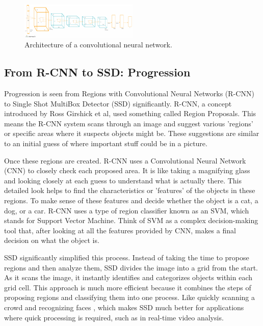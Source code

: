 \documentclass[11pt,journal,compsoc]{IEEEtran}
\begin{document}
\begin{figure}[ht]
  \centering
  \includegraphics[width=0.5\textwidth]{images/cnn_architecture.png} 
  \caption{Architecture of a convolutional neural network.}
  \label{fig:cnn}
\end{figure}

\subsection{From R-CNN to SSD: Progression}
Progression is seen from Regions with Convolutional Neural Networks (R-CNN) to Single Shot MultiBox Detector (SSD) significantly.  R-CNN, a concept introduced by Ross Girshick et al, used something called Region Proposals. This means the R-CNN system scans through an image and suggest various 'regions' or specific areas where it suspects objects might be. These suggestions are similar to an initial guess of where important stuff could be in a picture.

Once these regions are created. R-CNN uses a Convolutional Neural Network (CNN) to closely check each proposed area. It is like taking a magnifying glass and looking closely at each guess to understand what is actually there. This detailed look helps to find the characteristics or 'features' of the objects in these regions. To make sense of these features and decide whether the object is a cat, a dog, or a car. R-CNN uses a type of region classifier known as an SVM, which stands for Support Vector Machine.\cite{Girshick_2014_CVPR} Think of SVM as a complex decision-making tool that, after looking at all the features provided by CNN, makes a final decision on what the object is.

SSD\cite{9262816} significantly simplified this process. Instead of taking the time to propose regions and then analyze them, SSD divides the image into a grid from the start. As it scans the image, it instantly identifies and categorizes objects within each grid cell. This approach is much more efficient because it combines the steps of proposing regions and classifying them into one process. Like quickly scanning a crowd and recognizing faces , which makes SSD much better for applications where quick processing is required, such as in real-time video analysis.
\end{document}
